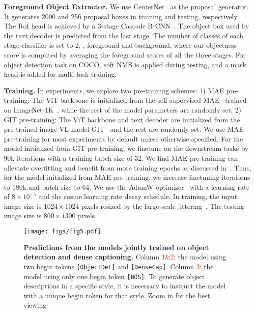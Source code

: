 \documentclass[10pt,twocolumn,letterpaper]{article}
\newcommand{\myparagraph}[1]{{\vspace{0.5em} \noindent \bf #1}}
\begin{document}
\myparagraph{Foreground Object Extractor.} We use CenterNet~\cite{zhou2019objects} as the proposal generator. It generates 2000 and 256 proposal boxes in training and testing, respectively. The RoI head is achieved by a 3-stage Cascade R-CNN~\cite{cai2018cascade}. The object box used by the text decoder is predicted from the last stage. The number of classes of each stage classifier is set to 2, \ie, foreground and background, where our objectness score is computed by averaging the foreground scores of all the three stages. For object detection task on COCO, soft NMS is applied during testing, and a mask head is added for multi-task training.

\myparagraph{Training.} In experiments, we explore two pre-training schemes: 1) MAE pre-training: The ViT backbone is initialized from the self-supervised MAE~\cite{he2022masked} trained on ImageNet-1K~\cite{deng2009imagenet}, while the rest of the model parameters are randomly set; 2) GIT pre-training: The ViT backbone and text decoder are initialized from the pre-trained image VL model GIT~\cite{wang2022git} and the rest are randomly set. We use MAE pre-training for most experiments by default unless otherwise specified. For the model initialized from GIT pre-training, we finetune on the downstream tasks by 90k iterations with a training batch size of 32. We find MAE pre-training can alleviate overfitting and benefit from more training epochs as discussed in~\cite{li2022exploring}. Thus, for the model initialized from MAE pre-training, we increase finetuning iterations to 180k and batch size to 64. We use the AdamW optimizer~\cite{loshchilov2017decoupled} with a learning rate of $8\times10^{-5}$ and the cosine learning rate decay schedule. In training, the input image size is $1024\times1024$ pixels resized by the large-scale jittering~\cite{ghiasi2021simple}. The testing image size is $800\times1300$ pixels.

\begin{figure*}[t!]
	\centering
	\texttt{[image: figs/fig5.pdf]}
	\vspace{-5mm}
	\caption{\textbf{Predictions from the models jointly trained on object detection and dense captioning.} Column \textcolor{red}{1\&2}: the model using two begin tokens \texttt{[ObjectDet]} and \texttt{[DenseCap]}. Column \textcolor{red}{3}: the model using only one begin token \texttt{[BOS]}. To generate object descriptions in a specific style, it is necessary to instruct the model with a unique begin token for that style. Zoom in for the best viewing}
	\label{fig:fig5}
\end{figure*}
\end{document}
